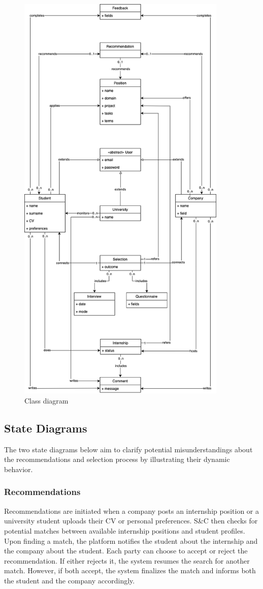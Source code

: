 \begin{figure}
    \centering
    \includegraphics[width=10cm]{images/class-diagram.png}
    \caption{Class diagram}
\end{figure}

\subsection{State Diagrams}
The two state diagrams below aim to clarify potential misunderstandings about the recommendations and selection process by illustrating their dynamic behavior.

\subsubsection{Recommendations}
Recommendations are initiated when a company posts an internship position or a university student uploads their CV or personal preferences.
S\&C then checks for potential matches between available internship positions and student profiles.
Upon finding a match, the platform notifies the student about the internship and the company about the student.
Each party can choose to accept or reject the recommendation.
If either rejects it, the system resumes the search for another match.
However, if both accept, the system finalizes the match and informs both the student and the company accordingly.

